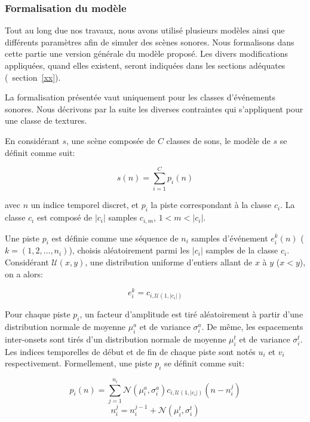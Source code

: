 \subsubsection{Formalisation du modèle}
 
 Tout au long due nos travaux, nous avons utilisé plusieurs modèles ainsi que différents paramètres afin de simuler des scènes sonores. Nous formalisons dans cette partie une version générale du modèle proposé. Les divers modifications appliquées, quand elles existent, seront indiquées dans les sections adéquates (\cf~section~\ref{xx}).
 
La formalisation présentée vaut uniquement pour les classes d'événements sonores. Nous décrivons par la suite les diverses contraintes qui s'appliquent pour une classe de textures.
 
En considérant $s$, une scène composée de $C$ classes de sons, le modèle de $s$ se définit  comme suit:
 
 \begin{equation}
 s(n)=\sum_{i=1}^{C}p_i(n)
 \end{equation}

avec $n$ un indice temporel discret, et $p_i$ la piste correspondant à la classe $c_i$. La classe $c_i$ est composé de $\vert c_i\vert$ samples $c_{i,m}$, $1<m<\vert c_i\vert$. 

Une piste $p_i$ est définie comme une séquence de $n_i$ samples d'événement $e^k_i(n)$ ($k=(1,2,\ldots,n_i)$), choisis aléatoirement parmi les $\vert c_i\vert$ samples de la classe $c_i$. Considérant $\mathcal{U}(x,y)$, une distribution uniforme d'entiers allant de $x$ à $y$ ($x<y$), on a alors:

 \begin{equation}
 e^k_i=c_{i,\mathcal{U}(1,\vert c_i \vert)}
 \end{equation}

 Pour chaque piste $p_i$, un facteur d'amplitude est tiré aléatoirement à partir d'une distribution normale de moyenne $\mu^a_i$ et de variance $\sigma^a_i$. De même, les espacements inter-onsets sont tirés d'un distribution normale de moyenne $\mu^t_i$ et de variance $\sigma^t_i$. Les indices temporelles de début et de fin de chaque piste sont notés $u_i$ et $v_i$ respectivement. Formellement, une piste $p_i$ se définit comme suit:
 
\begin{equation}
\label{eq1}
p_{i}(n)= \sum_{j=1}^{n_i} \mathcal{N}(\mu^a_{i},\sigma^a_{i})c_{i, \mathcal{U} (1, |c_i|)}(n-n^j_i)
\end{equation}
\begin{equation}
\label{eq2}
n_i^j=n_i^{j-1} + \mathcal{N}({\mu^t_{i},\sigma^t_{i}})
\end{equation}

